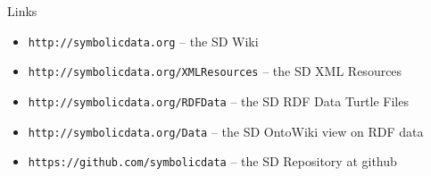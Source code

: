 \documentclass{beamer}
\begin{document}
\begin{frame}{Links}{}\small
\begin{itemize}
\item \texttt{http://symbolicdata.org} -- the SD Wiki
\item \texttt{http://symbolicdata.org/XMLResources} -- the SD XML Resources
\item \texttt{http://symbolicdata.org/RDFData} -- the SD RDF Data Turtle Files
\item \texttt{http://symbolicdata.org/Data} -- the SD OntoWiki view on RDF
  data
\item \texttt{https://github.com/symbolicdata} -- the SD Repository at github
\end{itemize}
\end{frame}
\end{document}
